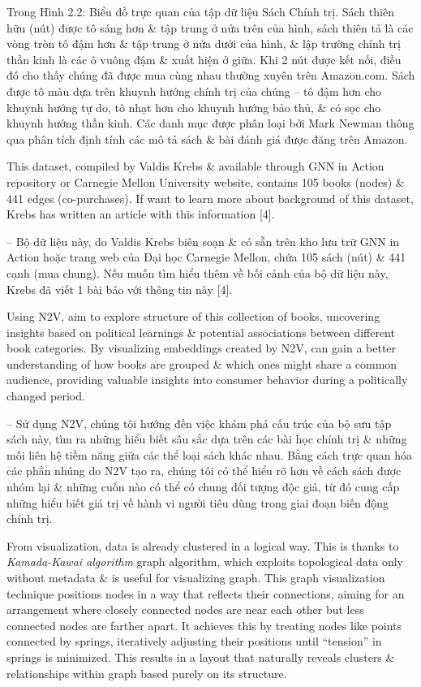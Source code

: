 \documentclass{article}
\begin{document}
\begin{itemize}
\begin{itemize}
\begin{enumerate}
        \end{enumerate}
        Trong {\sf Hình 2.2: Biểu đồ trực quan của tập dữ liệu Sách Chính trị. Sách thiên hữu (nút) được tô sáng hơn \& tập trung ở nửa trên của hình, sách thiên tả là các vòng tròn tô đậm hơn \& tập trung ở nửa dưới của hình, \& lập trường chính trị thần kinh là các ô vuông đậm \& xuất hiện ở giữa. Khi 2 nút được kết nối, điều đó cho thấy chúng đã được mua cùng nhau thường xuyên trên Amazon.com.} Sách được tô màu dựa trên khuynh hướng chính trị của chúng -- tô đậm hơn cho khuynh hướng tự do, tô nhạt hơn cho khuynh hướng bảo thủ, \& có sọc cho khuynh hướng thần kinh. Các danh mục được phân loại bởi {\sc Mark Newman} thông qua phân tích định tính các mô tả sách \& bài đánh giá được đăng trên Amazon.

        This dataset, compiled by {\sc Valdis Krebs} \& available through GNN in Action repository or Carnegie Mellon University website, contains 105 books (nodes) \& 441 edges (co-purchases). If want to learn more about background of this dataset, {\sc Krebs} has written an article with this information [4].

        -- Bộ dữ liệu này, do {\sc Valdis Krebs} biên soạn \& có sẵn trên kho lưu trữ GNN in Action hoặc trang web của Đại học Carnegie Mellon, chứa 105 sách (nút) \& 441 cạnh (mua chung). Nếu muốn tìm hiểu thêm về bối cảnh của bộ dữ liệu này, {\sc Krebs} đã viết 1 bài báo với thông tin này [4].

        Using N2V, aim to explore structure of this collection of books, uncovering insights based on political learnings \& potential associations between different book categories. By visualizing embeddings created by N2V, can gain a better understanding of how books are grouped \& which ones might share a common audience, providing valuable insights into consumer behavior during a politically changed period.

        -- Sử dụng N2V, chúng tôi hướng đến việc khám phá cấu trúc của bộ sưu tập sách này, tìm ra những hiểu biết sâu sắc dựa trên các bài học chính trị \& những mối liên hệ tiềm năng giữa các thể loại sách khác nhau. Bằng cách trực quan hóa các phần nhúng do N2V tạo ra, chúng tôi có thể hiểu rõ hơn về cách sách được nhóm lại \& những cuốn nào có thể có chung đối tượng độc giả, từ đó cung cấp những hiểu biết giá trị về hành vi người tiêu dùng trong giai đoạn biến động chính trị.

        From visualization, data is already clustered in a logical way. This is thanks to {\it Kamada-Kawai algorithm} graph algorithm, which exploits topological data only without metadata \& is useful for visualizing graph. This graph visualization technique positions nodes in a way that reflects their connections, aiming for an arrangement where closely connected nodes are near each other but less connected nodes are farther apart. It achieves this by treating nodes like points connected by springs, iteratively adjusting their positions until ``tension'' in springs is minimized. This results in a layout that naturally reveals clusters \& relationships within graph based purely on its structure.


\end{itemize}
\end{itemize}
\end{document}
